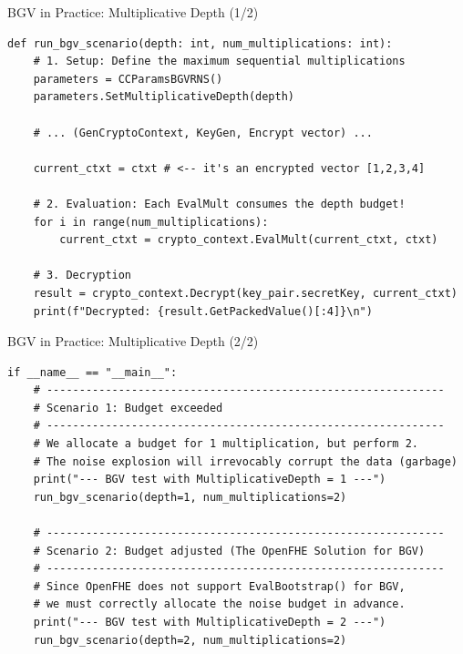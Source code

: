 \documentclass[aspectratio=169, 10pt]{beamer}
\begin{document}
\begin{frame}[fragile]{BGV in Practice: Multiplicative Depth (1/2)}
\vspace{0.1cm}
\begin{lstlisting}[firstnumber=1]
def run_bgv_scenario(depth: int, num_multiplications: int):
    # 1. Setup: Define the maximum sequential multiplications
    parameters = CCParamsBGVRNS()
    parameters.SetMultiplicativeDepth(depth)
    
    # ... (GenCryptoContext, KeyGen, Encrypt vector) ...
    
    current_ctxt = ctxt # <-- it's an encrypted vector [1,2,3,4]
    
    # 2. Evaluation: Each EvalMult consumes the depth budget!
    for i in range(num_multiplications):
        current_ctxt = crypto_context.EvalMult(current_ctxt, ctxt)

    # 3. Decryption
    result = crypto_context.Decrypt(key_pair.secretKey, current_ctxt)
    print(f"Decrypted: {result.GetPackedValue()[:4]}\n")
\end{lstlisting}
\end{frame}

\begin{frame}[fragile]{BGV in Practice: Multiplicative Depth (2/2)}
\vspace{0.1cm}
\begin{lstlisting}[firstnumber=24]
if __name__ == "__main__":
    # -------------------------------------------------------------
    # Scenario 1: Budget exceeded
    # -------------------------------------------------------------
    # We allocate a budget for 1 multiplication, but perform 2.
    # The noise explosion will irrevocably corrupt the data (garbage)
    print("--- BGV test with MultiplicativeDepth = 1 ---")
    run_bgv_scenario(depth=1, num_multiplications=2)
    
    # -------------------------------------------------------------
    # Scenario 2: Budget adjusted (The OpenFHE Solution for BGV)
    # -------------------------------------------------------------
    # Since OpenFHE does not support EvalBootstrap() for BGV, 
    # we must correctly allocate the noise budget in advance.
    print("--- BGV test with MultiplicativeDepth = 2 ---")
    run_bgv_scenario(depth=2, num_multiplications=2)
\end{lstlisting}
\end{frame}
\end{document}
